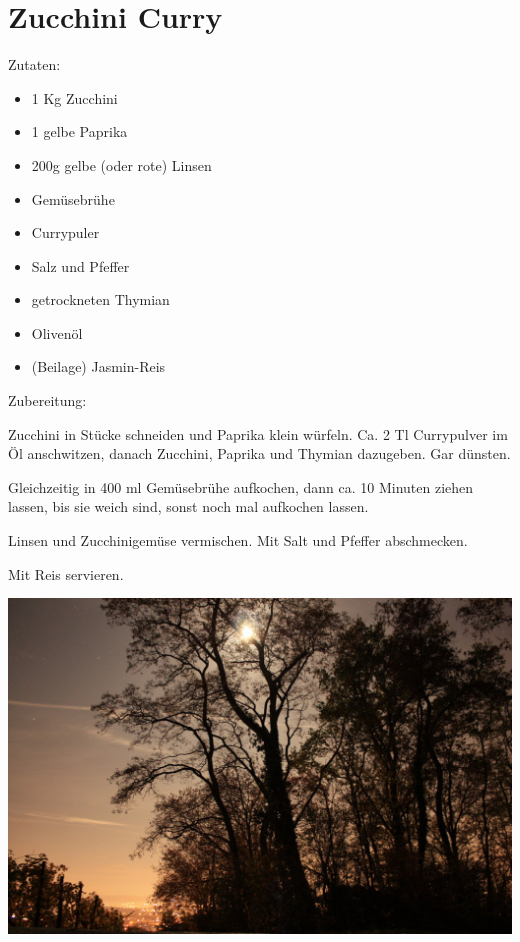 \section{Zucchini Curry}
Zutaten:
\begin{itemize}
    \item 1 Kg Zucchini
    \item 1 gelbe Paprika
    \item 200g gelbe (oder rote) Linsen
    \item Gemüsebrühe
    \item Currypuler
    \item Salz und Pfeffer
    \item getrockneten Thymian
    \item Olivenöl
    \item (Beilage) Jasmin-Reis
\end{itemize}

\noindent Zubereitung:

\noindent Zucchini in Stücke schneiden und Paprika klein würfeln. Ca. 2 Tl
Currypulver im Öl anschwitzen, danach Zucchini, Paprika und Thymian dazugeben.
Gar dünsten.

Gleichzeitig in 400 ml Gemüsebrühe aufkochen, dann ca. 10 Minuten ziehen
lassen, bis sie weich sind, sonst noch mal aufkochen lassen.

Linsen und Zucchinigemüse vermischen. Mit Salt und Pfeffer abschmecken.

Mit Reis servieren.
\newpage
\mbox{}
\vfill
\begin{center}
    \includegraphics[width=\textwidth]{Zucchini-Curry/IMG_5831_small.jpg}
\end{center}
\vfill
\mbox{ }
\newpage

